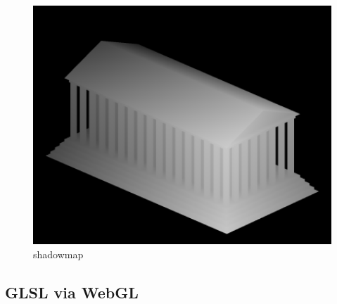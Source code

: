\begin{figure}[H]
    \centering
    \includegraphics[width=1.0\textwidth]{images/sm_zb.png}
    \caption{shadowmap}
\end{figure}


\subsection{GLSL via WebGL}
